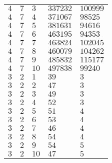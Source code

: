 \begin{table}[ht]
\begin{tabular}{l|l|l|l|l}
$4$ & $7$ & $3$ & $337232$ & $100999$\\
$4$ & $7$ & $4$ & $371067$ & $98525$\\
$4$ & $7$ & $5$ & $381631$ & $94616$\\
$4$ & $7$ & $6$ & $463195$ & $94353$\\
$4$ & $7$ & $7$ & $463824$ & $102045$\\
$4$ & $7$ & $8$ & $460079$ & $104262$\\
$4$ & $7$ & $9$ & $485832$ & $115177$\\
$4$ & $7$ & $10$ & $497838$ & $99240$\\
$3$ & $2$ & $1$ & $39$ & $3$\\
$3$ & $2$ & $2$ & $47$ & $3$\\
$3$ & $2$ & $3$ & $49$ & $3$\\
$3$ & $2$ & $4$ & $52$ & $3$\\
$3$ & $2$ & $5$ & $51$ & $4$\\
$3$ & $2$ & $6$ & $53$ & $4$\\
$3$ & $2$ & $7$ & $46$ & $4$\\
$3$ & $2$ & $8$ & $54$ & $4$\\
$3$ & $2$ & $9$ & $54$ & $5$\\
$3$ & $2$ & $10$ & $47$ & $5$\\
\end{tabular}
\end{table}

